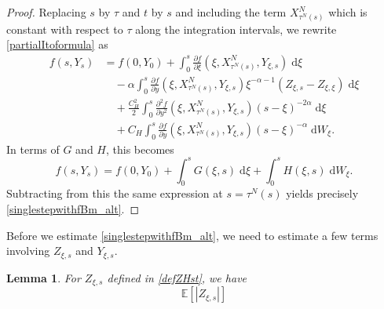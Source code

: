 \documentclass[reqno,12pt]{amsart}
\theoremstyle{plain}%
\newtheorem{lem}{Lemma}[section]
\theoremstyle{definition}
\begin{document}
\begin{proof}
    Replacing $s$ by $\tau$ and $t$ by $s$ and including the term $X_{\tau^N(s)}^N$ which is constant with respect to $\tau$ along the integration intervals, we rewrite \eqref{partialItoformula} as
    \begin{align*}
        f(s, Y_s) & = f(0, Y_0) + \int_{0}^s \frac{\partial f}{\partial \xi}(\xi, X_{\tau^N(s)}^N, Y_{\xi, s})\;\mathrm{d}\xi \\ 
        & \quad - \alpha \int_{0}^s \frac{\partial f}{\partial y}(\xi, X_{\tau^N(s)}^N, Y_{\xi, s})\xi^{-\alpha - 1} (Z_{\xi, s} - Z_{\xi, \xi})\;\mathrm{d}\xi \\
        & \quad + \frac{C_H^2}{2}\int_{0}^s \frac{\partial^2 f}{\partial y^2}(\xi, X_{\tau^N(s)}^N, Y_{\xi, s}) (s - \xi)^{-2\alpha} \;\mathrm{d}\xi \\
        & \quad + C_H \int_{0}^s \frac{\partial f}{\partial y}(\xi, X_{\tau^N(s)}^N, Y_{\xi, s})(s - \xi)^{-\alpha}\;\mathrm{d} W_\xi.
    \end{align*}
    In terms of $G$ and $H$, this becomes
    \[
        f(s, Y_s) = f(0, Y_0) + \int_0^s G(\xi, s)\;\mathrm{d}\xi + \int_0^s H(\xi, s)\;\mathrm{d}W_{\xi}.
    \]
    Subtracting from this the same expression at $s=\tau^N(s)$ yields precisely \eqref{singlestepwithfBm_alt}.
\end{proof}

Before we estimate \eqref{singlestepwithfBm_alt}, we need to estimate a few terms involving $Z_{\xi, s}$ and $Y_{\xi, s}$.
\begin{lem}
    \label{lemZYestimates}
    For $Z_{\xi, s}$ defined in \eqref{defZHst}, we have
    \begin{equation}
        \mathbb{E}\left[|Z_{\xi, s}|\right]
    \end{equation}
\end{lem}
\end{document}
